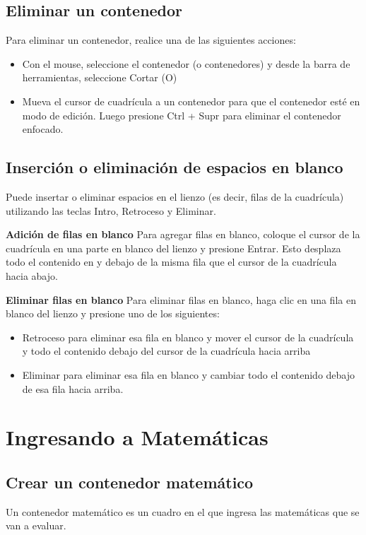 \subsection{Eliminar un contenedor}
Para eliminar un contenedor, realice una de las siguientes acciones:

\begin{itemize}
  \item Con el mouse, seleccione el contenedor (o contenedores) y desde la barra de herramientas, seleccione Cortar (O)

\item Mueva el cursor de cuadrícula a un contenedor para que el contenedor esté en modo de edición. Luego presione Ctrl + Supr para eliminar el contenedor enfocado.
\end{itemize}

\subsection{Inserción o eliminación de espacios en blanco}
Puede insertar o eliminar espacios en el lienzo (es decir, filas de la cuadrícula) utilizando las teclas Intro, Retroceso y Eliminar.

\textbf{Adición de filas en blanco}
Para agregar filas en blanco, coloque el cursor de la cuadrícula en una parte en blanco del lienzo y presione Entrar. Esto desplaza todo el contenido en y debajo de la misma fila que el cursor de la cuadrícula hacia abajo.

\textbf{Eliminar filas en blanco}
Para eliminar filas en blanco, haga clic en una fila en blanco del lienzo y presione uno de los siguientes:

\begin{itemize}
  \item Retroceso para eliminar esa fila en blanco y mover el cursor de la cuadrícula y todo el contenido debajo del cursor de la cuadrícula hacia arriba
  
  \item Eliminar para eliminar esa fila en blanco y cambiar todo el contenido debajo de esa fila hacia arriba.
\end{itemize}

\section{Ingresando a Matemáticas}
\subsection{Crear un contenedor matemático}
Un contenedor matemático es un cuadro en el que ingresa las matemáticas que se van a evaluar.

